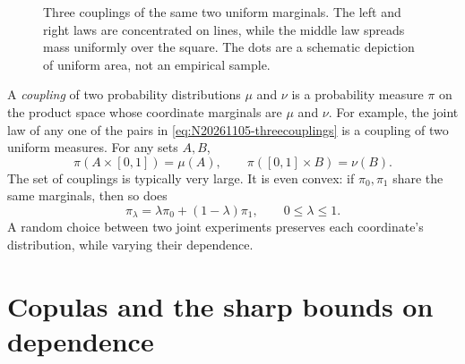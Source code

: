 \begin{figure}[htbp]
\centering
{}
\caption{Three couplings of the same two uniform marginals. The left and right laws are concentrated on lines, while the middle law spreads mass uniformly over the square. The dots are a schematic depiction of uniform area, not an empirical sample.}
\label{fig:N20261105-threecouplings}
\end{figure}

A \emph{coupling} of two probability distributions \(\mu\) and \(\nu\) is a probability measure \(\pi\) on the product space whose coordinate marginals are \(\mu\) and \(\nu\). For example, the joint law of any one of the pairs in \eqref{eq:N20261105-threecouplings} is a coupling of two uniform measures. For any sets \(A,B\),
\[
 \pi(A\times[0,1])=\mu(A),\qquad
 \pi([0,1]\times B)=\nu(B).
\]
The set of couplings is typically very large. It is even convex: if \(\pi_0,\pi_1\) share the same marginals, then so does
\[
 \pi_\lambda=\lambda\pi_0+(1-\lambda)\pi_1,
 \qquad0\leq\lambda\leq1.
\]
A random choice between two joint experiments preserves each coordinate's distribution, while varying their dependence.

\section{Copulas and the sharp bounds on dependence}

